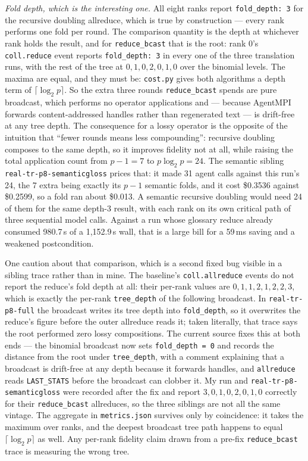 \documentclass[11pt]{article}
\begin{document}
\emph{Fold depth, which is the interesting one.} All eight ranks report \texttt{fold\_depth: 3} for
the recursive doubling allreduce, which is true by construction --- every rank performs one fold per
round. The comparison quantity is the depth at whichever rank holds the result, and for
\texttt{reduce\_bcast} that is the root: rank 0's \texttt{coll.reduce} event reports
\texttt{fold\_depth: 3} in every one of the three translation runs, with the rest of the tree at
$0,1,0,2,0,1,0$ over the binomial levels. The maxima are equal, and they must be:
\texttt{cost.py} gives both algorithms a depth term of $\lceil \log_2 p\rceil$. So the extra three
rounds \texttt{reduce\_bcast} spends are pure broadcast,
which performs no operator applications and --- because AgentMPI forwards content-addressed
handles rather than regenerated text --- is drift-free at any tree depth. The consequence for a
lossy operator is the opposite of the intuition that ``fewer rounds means less compounding'':
recursive doubling composes to the same depth, so it improves fidelity not at all, while raising
the total application count from $p-1=7$ to $p\log_2 p=24$. The semantic sibling
\texttt{real-tr-p8-semanticgloss} prices that: it made 31 agent calls against this run's 24, the
7 extra being exactly its $p-1$ semantic folds, and it cost \$0.3536 against \$0.2599, so a fold
ran about \$0.013. A semantic recursive doubling would need 24 of them for the same depth-3
result, with each rank on its own critical path of three sequential model calls. Against a run
whose glossary reduce already consumed 980.7\,s of a 1,152.9\,s wall, that is a large bill for a
59\,ms saving and a weakened postcondition.

One caution about that comparison, which is a second fixed bug visible in a sibling trace rather
than in mine. The baseline's \texttt{coll.allreduce} events do not report the reduce's fold depth at
all: their per-rank values are $0,1,1,2,1,2,2,3$, which is exactly the per-rank
\texttt{tree\_depth} of the following broadcast. In \texttt{real-tr-p8-full} the broadcast writes
its tree depth into \texttt{fold\_depth}, so it overwrites the reduce's figure before the outer
allreduce reads it; taken literally, that trace says the root performed zero lossy compositions.
The current source fixes this at both ends --- the binomial broadcast now sets
\texttt{fold\_depth = 0} and records the distance from the root under \texttt{tree\_depth}, with a
comment explaining that a broadcast is drift-free at any depth because it forwards handles, and
\texttt{allreduce} reads \texttt{LAST\_STATS} before the broadcast can clobber it. My run and
\texttt{real-tr-p8-semanticgloss} were recorded after the fix and report
$3,0,1,0,2,0,1,0$ correctly for their \texttt{reduce\_bcast} allreduces, so the three siblings are
not all the same vintage. The aggregate in \texttt{metrics.json} survives only by coincidence: it
takes the maximum over ranks, and the deepest broadcast tree path happens to equal
$\lceil \log_2 p\rceil$ as well. Any per-rank fidelity claim drawn from a pre-fix
\texttt{reduce\_bcast} trace is measuring the wrong tree.
\end{document}
